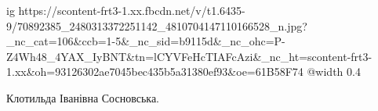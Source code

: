  
 
 
 
 

\ifcmt
  ig https://scontent-frt3-1.xx.fbcdn.net/v/t1.6435-9/70892385_2480313372251142_4810704147110166528_n.jpg?_nc_cat=106&ccb=1-5&_nc_sid=b9115d&_nc_ohc=P-Z4Wh48_4YAX_IyBNT&tn=lCYVFeHcTIAFcAzi&_nc_ht=scontent-frt3-1.xx&oh=93126302ae7045bec435b5a31380ef93&oe=61B58F74
  @width 0.4
\fi


Клотильда Іванівна Сосновська.
